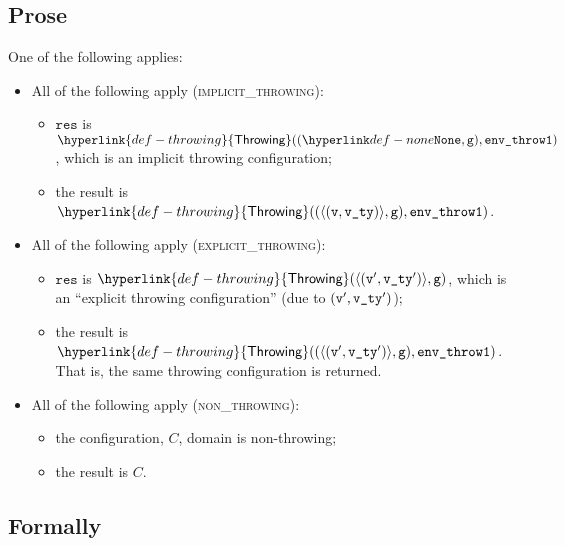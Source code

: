 \documentclass{book}
\newcommand\rethrowimplicit[0]{\hyperlink{def-rethrowimplicit}{\texttt{rethrow\_implicit}}}
\newcommand\valuereadfrom[0]{\hyperlink{def-valuereadfrom}{\textsf{value\_read\_from}}}
\newcommand\Throwing[0]{\hyperlink{def-throwing}{\textsf{Throwing}}}
\newcommand\vg[0]{\texttt{g}}
\newcommand\vres[0]{\texttt{res}}
\newcommand\envthrowone[0]{\texttt{env\_throw1}}
\newcommand\vvty[0]{\texttt{v\_ty}}
\newcommand\eid[0]{\texttt{e\_id}}
\begin{document}
\subsection{Prose}
One of the following applies:
\begin{itemize}
  \item All of the following apply (\textsc{implicit\_throwing}):
  \begin{itemize}
    \item $\vres$ is $\Throwing((\None, \vg), \envthrowone)$, which is an implicit throwing configuration;
    \item the result is $\Throwing((\langle(\vv, \vvty)\rangle, \vg), \envthrowone)$.
  \end{itemize}

  \item All of the following apply (\textsc{explicit\_throwing}):
  \begin{itemize}
    \item $\vres$ is $\Throwing(\langle(\vv', \vvty')\rangle, \vg)$, which is an ``explicit throwing configuration''
    (due to $(\vv', \vvty')$);
    \item the result is $\Throwing((\langle(\vv', \vvty')\rangle, \vg), \envthrowone)$. \\
    That is, the same throwing configuration is returned.
  \end{itemize}

  \item All of the following apply (\textsc{non\_throwing}):
  \begin{itemize}
    \item the configuration, $C$, domain is non-throwing;
    \item the result is $C$.
  \end{itemize}
\end{itemize}



\begin{emptyformal}
\subsection{Formally}
\end{emptyformal}
\end{document}
